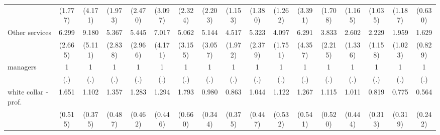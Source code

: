 {\begin{tabular}{l*{16}{c}}
                    &     (1.777)         &     (4.171)         &     (1.973)         &     (2.470)         &     (3.097)         &     (2.324)         &     (2.203)         &     (1.153)         &     (1.380)         &     (1.262)         &     (3.391)         &     (1.708)         &     (1.165)         &     (1.035)         &     (1.187)         &     (0.630)         \\
[1em]
Other services      &       6.299\sym{***}&       9.180\sym{***}&       5.367\sym{**} &       5.445\sym{**} &       7.017\sym{**} &       5.062\sym{**} &       5.144\sym{**} &       4.517\sym{***}&       5.323\sym{***}&       4.097\sym{***}&       6.291\sym{**} &       3.833\sym{*}  &       2.602         &       2.229         &       1.959         &       1.629         \\
                    &     (2.665)         &     (5.111)         &     (2.838)         &     (2.966)         &     (4.171)         &     (3.155)         &     (3.057)         &     (1.972)         &     (2.379)         &     (1.751)         &     (4.357)         &     (2.215)         &     (1.336)         &     (1.158)         &     (1.023)         &     (0.829)         \\
[1em]
managers            &           1         &           1         &           1         &           1         &           1         &           1         &           1         &           1         &           1         &           1         &           1         &           1         &           1         &           1         &           1         &           1         \\
                    &         (.)         &         (.)         &         (.)         &         (.)         &         (.)         &         (.)         &         (.)         &         (.)         &         (.)         &         (.)         &         (.)         &         (.)         &         (.)         &         (.)         &         (.)         &         (.)         \\
[1em]
white collar - prof.&       1.651         &       1.102         &       1.357         &       1.283         &       1.294         &       1.793         &       0.980         &       0.863         &       1.044         &       1.122         &       1.267         &       1.115         &       1.011         &       0.819         &       0.775         &       0.564         \\
                    &     (0.515)         &     (0.375)         &     (0.487)         &     (0.462)         &     (0.446)         &     (0.660)         &     (0.344)         &     (0.375)         &     (0.447)         &     (0.532)         &     (0.541)         &     (0.520)         &     (0.444)         &     (0.313)         &     (0.319)         &     (0.242)         \\

\end{tabular}}
